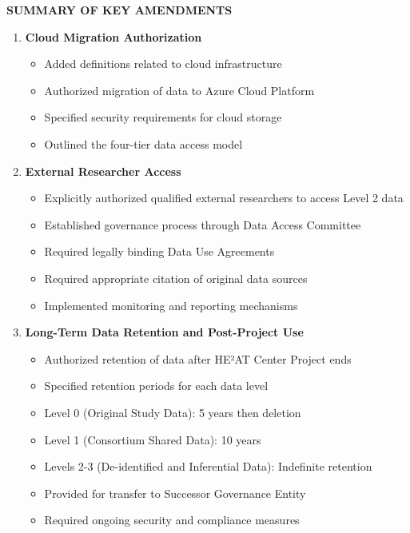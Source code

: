{\begin{enumerate}
\vspace{2cm}

\begin{center}
\textbf{\Large SUMMARY OF KEY AMENDMENTS}
\end{center}

\begin{enumerate}
\item \textbf{Cloud Migration Authorization}
   \begin{itemize}
   \item Added definitions related to cloud infrastructure
   \item Authorized migration of data to Azure Cloud Platform
   \item Specified security requirements for cloud storage
   \item Outlined the four-tier data access model
   \end{itemize}

\item \textbf{External Researcher Access}
   \begin{itemize}
   \item Explicitly authorized qualified external researchers to access Level 2 data
   \item Established governance process through Data Access Committee
   \item Required legally binding Data Use Agreements
   \item Required appropriate citation of original data sources
   \item Implemented monitoring and reporting mechanisms
   \end{itemize}

\item \textbf{Long-Term Data Retention and Post-Project Use}
   \begin{itemize}
   \item Authorized retention of data after HE²AT Center Project ends
   \item Specified retention periods for each data level
   \item Level 0 (Original Study Data): 5 years then deletion
   \item Level 1 (Consortium Shared Data): 10 years
   \item Levels 2-3 (De-identified and Inferential Data): Indefinite retention
   \item Provided for transfer to Successor Governance Entity
   \item Required ongoing security and compliance measures
   \end{itemize}


\end{enumerate}
\end{enumerate}}
